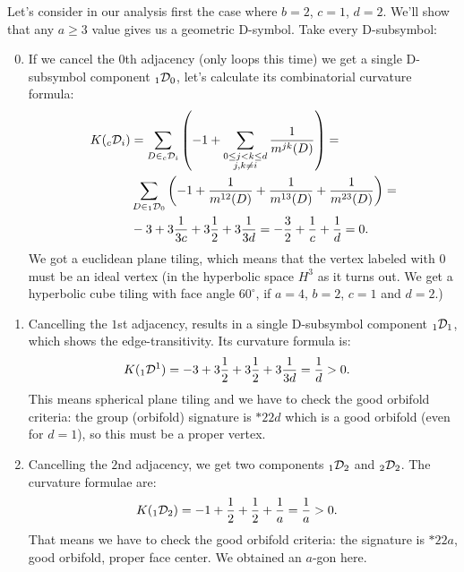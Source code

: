 \documentclass[12pt,a4paper]{article}
\numberwithin{equation}{section}
\newcommand{\leftsub}[2]{{\vphantom{#2}}_{#1}{#2}}
\theoremstyle{plain}%
\theoremstyle{definition}
\theoremstyle{remark}
\begin{document}
Let's consider in our analysis first the case where $b=2$, $c=1$, $d=2$. We'll show that any $a\geq3$ value
gives us a geometric D-symbol. Take every D-subsymbol:
\begin{enumerate}
  \setcounter{enumi}{-1}
  \item If we cancel the $0$th adjacency (only loops this time) we get a single D-subsymbol component
    $\leftsub{1}{\mathcal{D}}_0$, let's calculate its combinatorial curvature
    formula:
    \begin{align*}
      K(\leftsub{c}{\mathcal{D}}_i)&=\sum_{D\in
      \leftsub{c}{\mathcal{D}}_i}\left(-1+\sum_{\substack{0\le j<k\le d \\ j,k\ne i}}\frac{1}{m^{jk}(D)}\right)= \\
      &
      \sum_{D\in\leftsub{1}{\mathcal{D}}_0}\left(-1+\frac{1}{m^{12}(D)}+\frac{1}{m^{13}(D)}+\frac{1}{m^{23}(D)}\right)= \\
      & -3 + 3\frac{1}{3c} + 3\frac{1}{2} + 3\frac{1}{3d} =
      -\frac{3}{2}+\frac{1}{c}+\frac{1}{d} = 0.
    \end{align*}
    We got a euclidean plane tiling, which means that the vertex labeled with $0$ must
    be an ideal vertex (in the hyperbolic space $H^3$ as it turns out. We get a
    hyperbolic cube tiling with face angle $60^{\circ}$, if $a=4$, $b=2$, $c=1$ and
    $d=2$.)
  \item Cancelling the $1$st adjacency, results in a single D-subsymbol
    component $\leftsub{1}{\mathcal{D}}_1$, which
    shows the edge-transitivity. Its curvature formula is:
    \begin{align*}
      K(\leftsub{1}{\mathcal{D}^1})&= -3 + 3\frac{1}{2} + 3\frac{1}{2} +
      3\frac{1}{3d} = \frac{1}{d} > 0.
    \end{align*}
    This means spherical plane tiling and we have to check the good orbifold
    criteria: the group (orbifold) signature is
    $*22d$ which is a good orbifold (even for $d=1$), so this must be a proper vertex.
  \item Cancelling the $2$nd adjacency, we get two components
    $\leftsub{1}{\mathcal{D}}_2$ and $\leftsub{2}{\mathcal{D}}_2$. The curvature formulae are:
    \begin{align*}
      K(\leftsub{1}{\mathcal{D}}_2)&= -1 + \frac{1}{2} + \frac{1}{2} +
      \frac{1}{a} = \frac{1}{a} > 0.
    \end{align*}
    That means we have to check the good orbifold criteria: the signature is
    $*22a$, good orbifold, proper face center. We obtained an $a$-gon here.

\end{enumerate}
\end{document}

